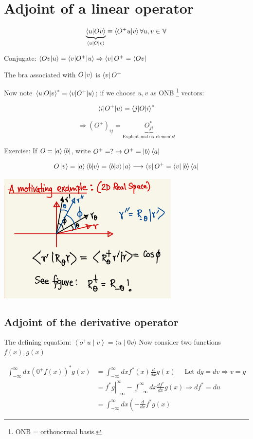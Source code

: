 \documentclass{article}
\begin{document}
\section{Adjoint of a linear operator}

$$\underbrace{\braket{u | Ov}}_{\braket{u | O | v}} \equiv \braket{O^+ u | v} \forall u,v \in \mathbb{V}$$

Conjugate: $\braket{O v | u} = \braket{v | O^+ | u} \Rightarrow \bra{v } O^+ = \bra{Ov}$

The bra associated with $O \ket{v}$ is $\bra{v} O^+$

Now note $\braket{u|O|v}^* = \braket{v|O^+|u}$; if we choose $u,v$ as ONB \footnote{ONB = orthonormal basis. } vectors:

$$\braket{i | O^+|u} = \braket{j|O|i}^*$$

$$\Rightarrow (O^+)_{ij} = \underbrace{O_{ji}^*}_{\text{Explicit matrix elements!}}$$

Exercise: If $O = \ket{a} \bra{b}$, write $O^+ = ? \rightarrow O^+ = \ket{b} \bra{a}$

$$O \ket{v} = \ket{a} \braket{b|v} = \braket{b|v} \ket{a} \longrightarrow \bra{v} O^+ = \bra{v} \ket{b} \bra{a}$$

\includegraphics[width = 0.4 \textwidth]{Lecture12/2.png}
\subsection{Adjoint of the derivative operator}


The defining equation: $\left\langle o^{+} u \mid v\right\rangle=\langle u \mid 0 v\rangle$
Now consider two functions $ f(x), g(x)$


$$
\begin{aligned}
\int_{-\infty}^{\infty} d x\left(0^{+} f(x)\right)^{*} g(x) &=\int_{-\infty}^{\infty} d x f^{*}(x) \frac{d}{d x} g(x) \quad \text { Let } d g=d v \Rightarrow v=g \\
&=\left.f^{*} g\right|_{-\infty} ^{\infty}-\int_{-\infty}^{\infty} d x \frac{d f^{*}}{d x} g(x) \Rightarrow d f^{*}=d u \\
&=\int_{-\infty}^{\infty} d x\left(-\frac{d}{d x} f^{*} g(x)\right.
\end{aligned}
$$
\end{document}
